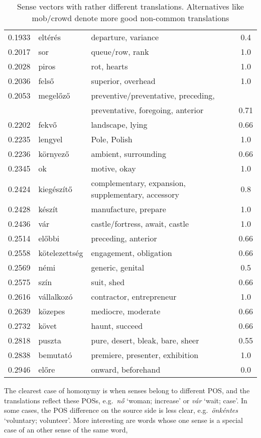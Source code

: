 \documentclass[11pt]{article}
\begin{document}
\begin{table*}
\begin{tabular}{cllc}
  0.1933 & eltérés 	& departure, variance	&  0.4 \\
  0.2017 & sor 	& queue/row, rank	&  1.0 \\
  0.2028 & piros 	& rot, hearts	&  1.0 \\
  0.2036 & felső 	& superior, overhead	&  1.0 \\
    0.2053 & megelőző 	& preventive/preventative, preceding,
    \\&&\hspace{1cm}preventative, foregoing, anterior	&  0.71 \\
  0.2202 & fekvő 	& landscape, lying	&  0.66 \\
  0.2235 & lengyel 	& Pole, Polish	&  1.0 \\
  0.2236 & környező 	& ambient, surrounding	& 0.66 \\
  0.2345 & ok 	& motive, okay	&  1.0 \\
  0.2424 & kiegészítő 	& complementary, expansion, supplementary, accessory	&  0.8 \\
  0.2428 & készít 	& manufacture, prepare	&  1.0 \\
  0.2436 & vár 	& castle/fortress, await, castle	&  1.0 \\
  0.2514 & előbbi 	& preceding, anterior	&  0.66 \\
  0.2558 & kötelezettség 	& engagement, obligation	& 0.66 \\
  0.2569 & némi 	& generic, genital	&  0.5 \\
  0.2575 & szín 	& suit, shed	&  0.66 \\
  0.2616 & vállalkozó 	& contractor, entrepreneur	&  1.0 \\
  0.2639 & közepes 	& mediocre, moderate	&  0.66 \\
  0.2732 & követ 	& haunt, succeed	&  0.66 \\
  0.2818 & puszta 	& pure, desert, bleak, bare, sheer	&  0.55 \\
  0.2838 & bemutató 	& premiere, presenter, exhibition	& 1.0 \\
  0.2946 & előre 	& onward, beforehand	&  0.0 \\
\end{tabular}
\caption{Sense vectors with rather different translations. Alternatives like
  mob/crowd denote more good non-common translations}
\label{tab:alkoto}
\end{table*}

The clearest case of homonymy is when senses belong to different POS, and the
translations reflect these POSs, e.g.~\emph{nő} `woman; increase' or \emph{vár}
`wait; case'.  In some cases, the POS difference on the source side is less
clear, e.g.~\emph{önkéntes} `voluntary; volunteer'. More interesting are words
whose one sense is a special case of an other sense of the same word,
\end{document}
